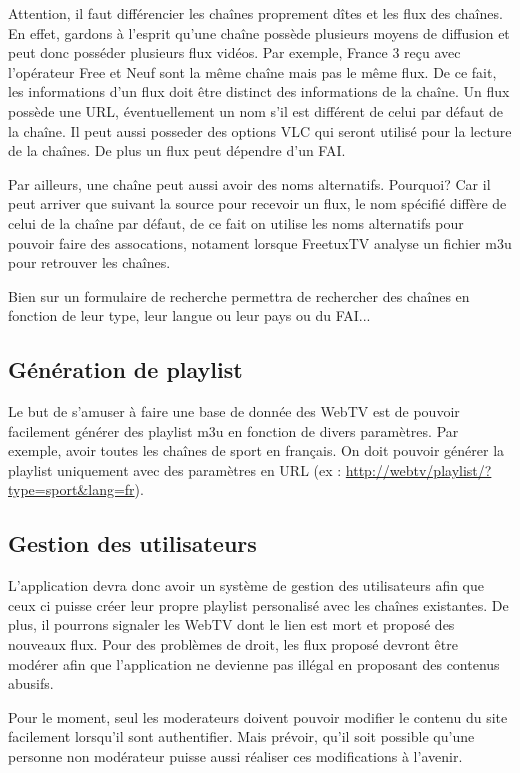 \documentclass[10pt,a4paper]{article}
\begin{document}
Attention, il faut différencier les chaînes proprement dîtes et les flux des chaînes. En effet, gardons à l'esprit qu'une chaîne possède plusieurs moyens de diffusion et peut donc posséder plusieurs flux vidéos. Par exemple, France 3 reçu avec l'opérateur Free et Neuf sont la même chaîne mais pas le même flux. De ce fait, les informations d'un flux doit être distinct des informations de la chaîne. Un flux possède une URL, éventuellement un nom s'il est différent de celui par défaut de la chaîne. Il peut aussi posseder des options VLC qui seront utilisé pour la lecture de la chaînes. De plus un flux peut dépendre d'un FAI.

Par ailleurs, une chaîne peut aussi avoir des noms alternatifs. Pourquoi? Car il peut arriver que suivant la source pour recevoir un flux, le nom spécifié diffère de celui de la chaîne par défaut, de ce fait on utilise les noms alternatifs pour pouvoir faire des assocations, notament lorsque FreetuxTV analyse un fichier m3u pour retrouver les chaînes.

Bien sur un formulaire de recherche permettra de rechercher des chaînes en fonction de leur type, leur langue ou leur pays ou du FAI...

\subsection{Génération de playlist}

Le but de s'amuser à faire une base de donnée des WebTV est de pouvoir facilement générer des playlist m3u en fonction de divers paramètres. Par exemple, avoir toutes les chaînes de sport en français. On doit pouvoir générer la playlist uniquement avec des paramètres en URL (ex : \url{http://webtv/playlist/?type=sport&lang=fr}).

\subsection{Gestion des utilisateurs}

L'application devra donc avoir un système de gestion des utilisateurs afin que ceux ci puisse créer leur propre playlist personalisé avec les chaînes existantes. De plus, il pourrons signaler les WebTV dont le lien est mort et proposé des nouveaux flux. Pour des problèmes de droit, les flux proposé devront être modérer afin que l'application ne devienne pas illégal en proposant des contenus abusifs.

Pour le moment, seul les moderateurs doivent pouvoir modifier le contenu du site facilement lorsqu'il sont authentifier. Mais prévoir, qu'il soit possible qu'une personne non modérateur puisse aussi réaliser ces modifications à l'avenir.
\end{document}
